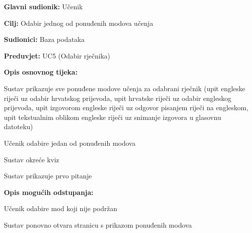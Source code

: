 					\noindent {}
					\begin{packed_item}
						
						\item \textbf{Glavni sudionik: }Učenik
						\item  \textbf{Cilj:} Odabir jednog od ponuđenih modova učenja 
						\item  \textbf{Sudionici:} Baza podataka
						\item  \textbf{Preduvjet:} UC5 (Odabir rječnika)
						\item  \textbf{Opis osnovnog tijeka:}
						
						\item[] \begin{packed_enum}
							
							\item Sustav prikazuje sve ponuđene modove učenja za odabrani rječnik (upit engleske riječi uz odabir hrvatskog prijevoda, upit hrvatske riječi uz odabir engleskog prijevoda, upit izgovorom engleske riječi uz odgovor pisanjem riječi na engleskom, upit tekstualnim oblikom engleske riječi uz snimanje izgovora u glasovnu datoteku)
							\item Učenik odabire jedan od ponuđenih modova
							\item Sustav okreće kviz
							\item Sustav prikazuje prvo pitanje
							
						\end{packed_enum}
						
						\item  \textbf{Opis mogućih odstupanja:}
						
						\item[] \begin{packed_item}
							
							\item[2.a] Učenik odabire mod koji nije podržan 
							\item[] \begin{packed_enum}
								
								\item Sustav ponovno otvara stranicu s prikazom ponuđenih modova
								
							\end{packed_enum}
							
						\end{packed_item}
							
					\end{packed_item}
					
